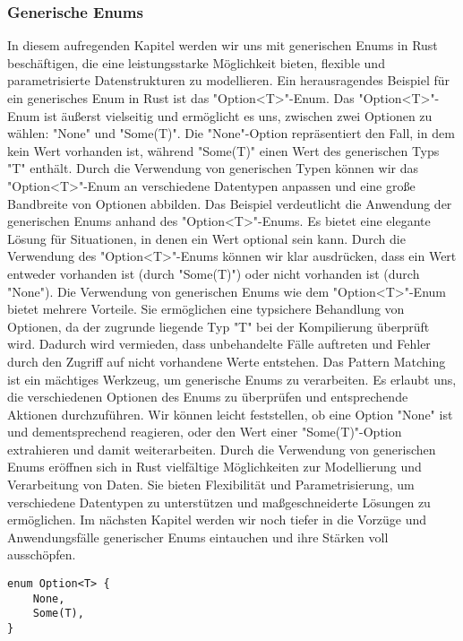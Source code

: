 \documentclass[a4paper, 1ppt]{article}
\begin{document}
\subsubsection{Generische Enums}
In diesem aufregenden Kapitel werden wir uns mit generischen Enums in Rust beschäftigen, die eine leistungsstarke Möglichkeit bieten, flexible und parametrisierte Datenstrukturen zu modellieren. Ein herausragendes Beispiel für ein generisches Enum in Rust ist das "Option<T>"-Enum.
Das "Option<T>"-Enum ist äußerst vielseitig und ermöglicht es uns, zwischen zwei Optionen zu wählen: "None" und "Some(T)". Die "None"-Option repräsentiert den Fall, in dem kein Wert vorhanden ist, während "Some(T)" einen Wert des generischen Typs "T" enthält. Durch die Verwendung von generischen Typen können wir das "Option<T>"-Enum an verschiedene Datentypen anpassen und eine große Bandbreite von Optionen abbilden.
Das Beispiel verdeutlicht die Anwendung der generischen Enums anhand des "Option<T>"-Enums. Es bietet eine elegante Lösung für Situationen, in denen ein Wert optional sein kann. Durch die Verwendung des "Option<T>"-Enums können wir klar ausdrücken, dass ein Wert entweder vorhanden ist (durch "Some(T)") oder nicht vorhanden ist (durch "None").
Die Verwendung von generischen Enums wie dem "Option<T>"-Enum bietet mehrere Vorteile. Sie ermöglichen eine typsichere Behandlung von Optionen, da der zugrunde liegende Typ "T" bei der Kompilierung überprüft wird. Dadurch wird vermieden, dass unbehandelte Fälle auftreten und Fehler durch den Zugriff auf nicht vorhandene Werte entstehen.
Das Pattern Matching ist ein mächtiges Werkzeug, um generische Enums zu verarbeiten. Es erlaubt uns, die verschiedenen Optionen des Enums zu überprüfen und entsprechende Aktionen durchzuführen. Wir können leicht feststellen, ob eine Option "None" ist und dementsprechend reagieren, oder den Wert einer "Some(T)"-Option extrahieren und damit weiterarbeiten.
Durch die Verwendung von generischen Enums eröffnen sich in Rust vielfältige Möglichkeiten zur Modellierung und Verarbeitung von Daten. Sie bieten Flexibilität und Parametrisierung, um verschiedene Datentypen zu unterstützen und maßgeschneiderte Lösungen zu ermöglichen. Im nächsten Kapitel werden wir noch tiefer in die Vorzüge und Anwendungsfälle generischer Enums eintauchen und ihre Stärken voll ausschöpfen.
\begin{verbatim}
enum Option<T> {
	None,
	Some(T),
}
\end{verbatim}
\end{document}
